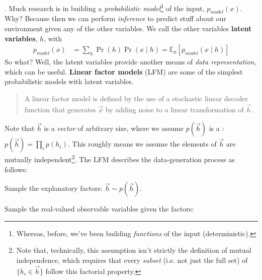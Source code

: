 \documentclass[11pt]{article}
\begin{document}
\myspace
\p {}. Much research is in building a \textit{probabilistic model}\footnote{Whereas, before, we've been building \textit{functions} of the input (deterministic).} of the input, $p_{model}(x)$. Why? Because then we can perform \textit{inference} to predict stuff about our environment given any of the other variables. We call the other variables \textbf{latent variables}, $h$, with
\begin{align}
	p_{model}(x) &= \sum_h \Pr(h)\Pr(x \mid h) = \mathbb{E}_h\left[ p_{model}(x \mid h)\right]
\end{align}
So what? Well, the latent variables provide another means of \textit{data representation}, which can be useful. \textbf{Linear factor models} (LFM) are some of the simplest probabilistic models with latent variables.
\begin{quote}
	A linear factor model is defined by the use of a stochastic linear decoder function that generates $\vec{x}$ by adding noise to a linear transformation of $\vec{h}$. 
\end{quote}
Note that $\vec{h}$ is a \textit{vector} of arbitrary size, where we assume $p(\vec{h})$ is a : $p(\vec{h}) = \prod_i p(h_i)$. This roughly means we assume the elements of $\vec{h}$ are mutually independent\footnote{Note that, technically, this assumption isn't strictly the definition of mutual independence, which requires that every \textit{subset} (i.e. not just the full set) of $\{h_i \in \vec{h}\}$ follow this factorial property.}. The LFM describes the data-generation process as follows:
\begin{compactenum}
	\item Sample the explanatory factors: $\vec{h} \sim p(\vec{h})$.
	\item Sample the real-valued observable variables given the factors:
	
\end{compactenum}
\end{document}
